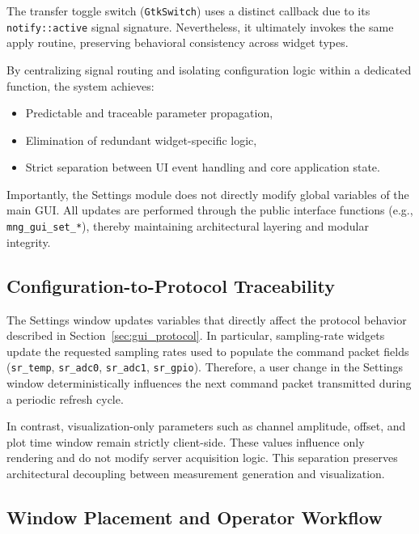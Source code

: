 The transfer toggle switch (\texttt{GtkSwitch}) uses a distinct callback due to its \texttt{notify::active} signal signature. Nevertheless, it ultimately invokes the same apply routine, preserving behavioral consistency across widget types.

By centralizing signal routing and isolating configuration logic within a dedicated function, the system achieves:

\begin{itemize}
	\item Predictable and traceable parameter propagation,
	\item Elimination of redundant widget-specific logic,
	\item Strict separation between UI event handling and core application state.
\end{itemize}

Importantly, the Settings module does not directly modify global variables of the main GUI. All updates are performed through the public interface functions (e.g., \texttt{mng\_gui\_set\_*}), thereby maintaining architectural layering and modular integrity.

\subsection{Configuration-to-Protocol Traceability}
\label{sec:gui_config_traceability}

The Settings window updates variables that directly affect the protocol behavior described in Section~\ref{sec:gui_protocol}. In particular, sampling-rate widgets update the requested sampling rates used to populate the command packet fields (\texttt{sr\_temp}, \texttt{sr\_adc0}, \texttt{sr\_adc1}, \texttt{sr\_gpio}). Therefore, a user change in the Settings window deterministically influences the next command packet transmitted during a periodic refresh cycle.

In contrast, visualization-only parameters such as channel amplitude, offset, and plot time window remain strictly client-side. These values influence only rendering and do not modify server acquisition logic. This separation preserves architectural decoupling between measurement generation and visualization.

\subsection{Window Placement and Operator Workflow}
\label{sec:gui_window_placement}

